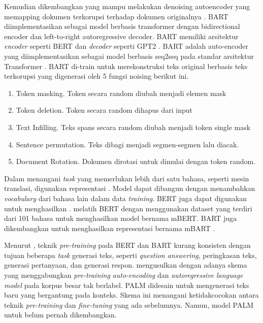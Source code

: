 Kemudian dikembangkan  yang mampu melakukan denoising autoencoder yang memapping dokumen terkorupsi terhadap dokumen originalnya .
\gls{BART} diimplementasikan sebagai model berbasis transformer dengan bidirectional encoder dan left-to-right autoregressive decoder.
\gls{BART} memiliki arsitektur \textit{encoder} seperti \gls{BERT}  dan \textit{decoder} seperti \gls{GPT2} .
\gls{BART}  adalah auto-encoder yang diimplementasikan sebagai model berbasis \gls{seq2seq} pada standar arsitektur Transformer .
\gls{BART} di-train untuk merekonstruksi teks original berbasis teks terkorupsi yang digenerasi oleh 5 fungsi noising berikut ini.
\begin{enumerate}
  \item Token masking.
  Token secara random diubah menjadi elemen mask
  \item Token deletion.
  Token secara random dihapus dari input
  \item Text Infilling.
  Teks spans secara random diubah menjadi token single mask
  \item Sentence permutation.
  Teks dibagi menjadi segmen-segmen lalu diacak.
  \item Document Rotation.
  Dokumen dirotasi untuk dimulai dengan token random.
\end{enumerate}


Dalam menangani \textit{task} yang memerlukan lebih dari satu bahasa, seperti mesin translasi, digunakan representasi \mwordem{}.
Model \multil{} dapat dibangun dengan menambahkan \textit{vocabulary} dari bahasa lain dalam data \textit{training}.
\gls{BERT} juga dapat digunakan untuk menghasilkan \mwordem{}.
\textcite{devlin2019} melatih \gls{BERT} dengan menggunakan dataset yang terdiri dari 101 bahasa untuk menghasilkan \multil{} model bernama mBERT.
\gls{BART} juga dikembangkan untuk menghasilkan representasi \mwordem{} bernama mBART .

Menurut \textcite{bi2020}, teknik \textit{pre-training} pada \gls{BERT} dan \gls{BART} kurang konsisten dengan tujuan beberapa \textit{task} generasi teks, seperti \textit{question answering}, peringkasan teks, generasi pertanyaan, dan generasi respon.
\textcite{bi2020} mengusulkan  dengan adanya skema yang menggabungkan \textit{pre-training} \textit{auto-encoding} dan \textit{autoregressive} \textit{language model} pada korpus besar tak berlabel.
\gls{PALM} didesain untuk mengenerasi teks baru yang bergantung pada konteks.
Skema ini menangani ketidakcocokan antara teknik \textit{pre-training} dan \textit{fine-tuning} yang ada sebelumnya.
Namun, model \gls{PALM} untuk \mwordem{} belum pernah dikembangkan.
